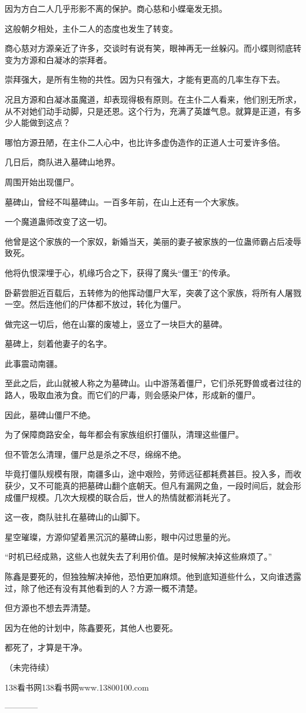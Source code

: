 \begin{this_body}
因为方白二人几乎形影不离的保护。商心慈和小蝶毫发无损。

这般朝夕相处，主仆二人的态度也发生了转变。

商心慈对方源亲近了许多，交谈时有说有笑，眼神再无一丝躲闪。而小蝶则彻底转变为方源和白凝冰的崇拜者。

崇拜强大，是所有生物的共性。因为只有强大，才能有更高的几率生存下去。

况且方源和白凝冰虽魔道，却表现得极有原则。在主仆二人看来，他们别无所求，从不对她们动手动脚，只是还恩。这个行为，充满了英雄气息。就算是正道，有多少人能做到这点？

哪怕方源丑陋，在主仆二人心中，也比许多虚伪造作的正道人士可爱许多倍。

几日后，商队进入墓碑山地界。

周围开始出现僵尸。

墓碑山，曾经不叫墓碑山。一百多年前，在山上还有一个大家族。

一个魔道蛊师改变了这一切。

他曾是这个家族的一个家奴，新婚当天，美丽的妻子被家族的一位蛊师霸占后凌辱致死。

他将仇恨深埋于心，机缘巧合之下，获得了魔头“僵王”的传承。

卧薪尝胆近百载后，五转修为的他挥动僵尸大军，突袭了这个家族，将所有人屠戮一空。然后连他们的尸体都不放过，转化为僵尸。

做完这一切后，他在山寨的废墟上，竖立了一块巨大的墓碑。

墓碑上，刻着他妻子的名字。

此事震动南疆。

至此之后，此山就被人称之为墓碑山。山中游荡着僵尸，它们杀死野兽或者过往的路人，吸取血液为食。而它们的尸毒，则会感染尸体，形成新的僵尸。

因此，墓碑山僵尸不绝。

为了保障商路安全，每年都会有家族组织打僵队，清理这些僵尸。

但不管怎么清理，僵尸总是杀之不尽，绵绵不绝。

毕竟打僵队规模有限，南疆多山，途中艰险，劳师远征都耗费甚巨。投入多，而收获少，又不可能真的把墓碑山翻个底朝天。但凡有漏网之鱼，一段时间后，就会形成僵尸规模。几次大规模的联合后，世人的热情就都消耗光了。

这一夜，商队驻扎在墓碑山的山脚下。

星空璀璨，方源仰望着黑沉沉的墓碑山影，眼中闪过思量的光。

“时机已经成熟，这些人也就失去了利用价值。是时候解决掉这些麻烦了。”

陈鑫是要死的，但独独解决掉他，恐怕更加麻烦。他到底知道些什么，又向谁透露过，除了他还有没有其他看到的人？方源一概不清楚。

但方源也不想去弄清楚。

因为在他的计划中，陈鑫要死，其他人也要死。

都死了，才算是干净。

（未完待续）

138看书网138看书网www.13800100.com

------------

\end{this_body}

